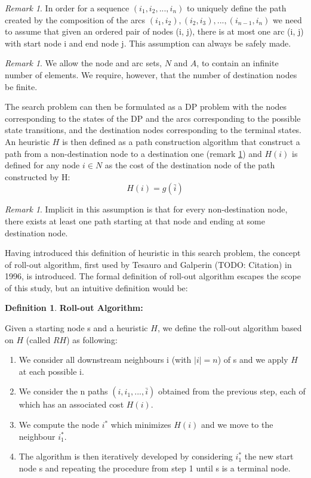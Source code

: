 \documentclass[12,twoside]{TFG-GM}
\theoremstyle{definition}
\newtheorem{definition}[theorem]{Definition}
\theoremstyle{remark}
\newtheorem{remark}[theorem]{Remark}
\newcommand*\diff[1]{\bar{#1}}
\begin{document}
\begin{remark} \label{seq_ass}
In order for a sequence $(i_1, i_2,..., i_n)$ to uniquely define the path created by the composition of the arcs $(i_1, i_2), (i_2, i_3),...,(i_{n-1}, i_n)$ we need to assume that given an ordered pair of nodes (i, j), there is at most one arc (i, j) with start node i and end node j. This assumption can always be safely made. 
\end{remark}

\begin{remark} \label{why_terminal_costs}
We allow the node and arc sets, $N$ and $A$, to contain an infinite number of elements. We require, however, that the number of destination nodes be finite.
\end{remark}

The search problem can then be formulated as a DP problem with the nodes corresponding to the states of the DP and the arcs corresponding to the possible state transitions, and the destination nodes corresponding to the terminal states. An heuristic $H$ is then defined as a path construction algorithm that construct a path from a non-destination node to a destination one (remark \ref{path_exists}) and $H(i)$ is defined for any node $i \in N$ as the cost of the destination node of the path constructed by H:
$$ H(i) = g(\diff{i}) $$

\begin{remark} \label{path_exists}
Implicit in this assumption is that for every non-destination node, there exists at least one path starting at that node and ending at some destination node.
\end{remark}

Having introduced this definition of heuristic in this search problem, the concept of roll-out algorithm, first used by Tesauro and Galperin (TODO: Citation) in 1996, is introduced. The formal definition of roll-out algorithm escapes the scope of this study, but an intuitive definition would be:
\begin{definition} \textbf{Roll-out Algorithm:}

Given a starting node s and a heuristic $H$, we define the roll-out algorithm based on $H$ (called $RH$) as following: 
\begin{enumerate}
\item We consider all downstream neighbours i (with $|i| = n$) of s and we apply $H$ at each possible i.
\item We consider the n paths $(i, i_1, ..., \diff{i})$ obtained from the previous step, each of which has an associated cost $H(i)$.
\item We compute the node $i^*$ which minimizes $H(i)$ and we move to the neighbour $i_1^*$.
\item The algorithm is then iteratively developed by considering $i_1^*$ the new start node s and repeating the procedure from step 1 until s is a terminal node.
\end{enumerate}
   
\end{definition}
\end{document}
